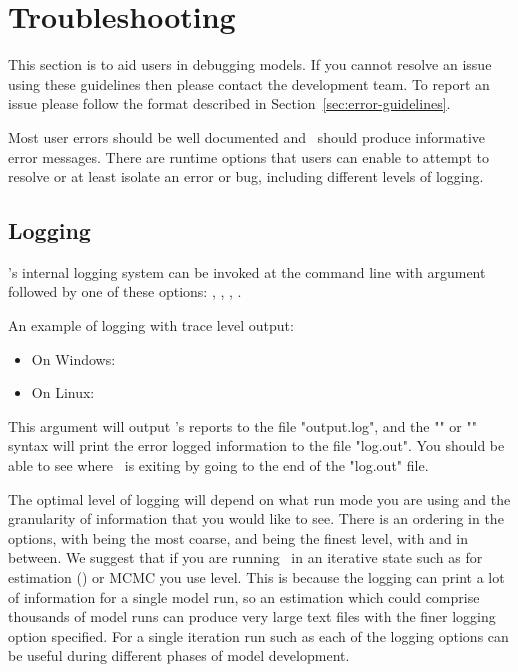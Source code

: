 \section{Troubleshooting\label{sec:trouble-shooting}}

This section is to aid users in debugging models. If you cannot resolve an issue using these guidelines then please contact the development team. To report an issue please follow the format described in Section~\ref{sec:error-guidelines}.

Most user errors should be well documented and \CNAME\ should produce informative error messages. There are runtime options that users can enable to attempt to resolve or at least isolate an error or bug, including different levels of logging.

\subsection{Logging}

\CNAME's internal logging system can be invoked at the command line with argument   followed by one of these options: , , , .

An example of logging with trace level output:

\begin{itemize}
	\item On Windows: 
	\item On Linux: 
\end{itemize}

This argument will output \CNAME's reports to the file "output.log", and the "" or "" syntax will print the error logged information to the file "log.out". You should be able to see where \CNAME\ is exiting by going to the end of the "log.out" file. 

The optimal level of logging will depend on what run mode you are using and the granularity of information that you would like to see. There is an ordering in the options, with  being the most coarse, and  being the finest level, with  and  in between. We suggest that if you are running \CNAME\ in an iterative state such as for estimation () or MCMC you use  level. This is because the logging can print a lot of information for a single model run, so an estimation which could comprise thousands of model runs can produce very large text files with the finer logging option specified. For a single iteration run such as  each of the logging options can be useful during different phases of model development.


